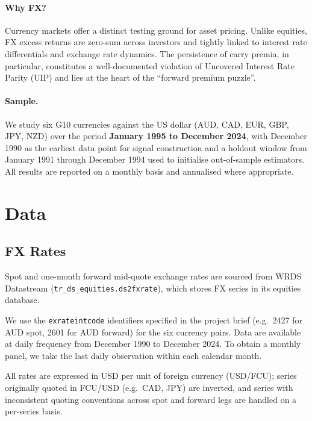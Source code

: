 \documentclass[a4paper,12pt]{article}
\begin{document}
\paragraph{Why FX?}
Currency markets offer a distinct testing ground for asset pricing. Unlike equities, FX
excess returns are zero-sum across investors and tightly linked to interest rate differentials
and exchange rate dynamics. The persistence of carry premia, in particular, constitutes a
well-documented violation of Uncovered Interest Rate Parity (UIP) and lies at the heart of
the ``forward premium puzzle''.

\paragraph{Sample.}
We study six G10 currencies against the US dollar (AUD, CAD, EUR, GBP, JPY, NZD) over
the period \textbf{January 1995 to December 2024}, with December 1990 as the earliest data
point for signal construction and a holdout window from January 1991 through December 1994
used to initialise out-of-sample estimators. All results are reported on a monthly basis
and annualised where appropriate.

\section{Data}
\label{sec:data}

\subsection{FX Rates}

Spot and one-month forward mid-quote exchange rates are sourced from WRDS Datastream
(\texttt{tr\_ds\_equities.ds2fxrate}), which stores FX series in its equities database.

We use the \texttt{exrateintcode} identifiers specified in the project brief
(e.g.\ 2427 for AUD spot, 2601 for AUD forward) for the six currency pairs. Data are
available at daily frequency from December 1990 to December 2024. To obtain a monthly
panel, we take the last daily observation within each calendar month.

All rates are expressed in USD per unit of foreign currency (USD/FCU); series originally
quoted in FCU/USD (e.g.\ CAD, JPY) are inverted, and series with inconsistent quoting
conventions across spot and forward legs are handled on a per-series basis.
\end{document}
